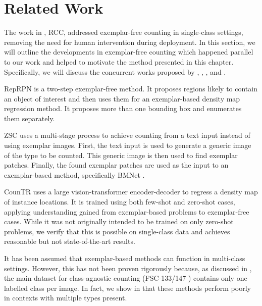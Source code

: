 \documentclass[../thesis.tex]{subfiles}
\begin{document}
\section{Related Work}
\label{relatedwork}
The work in , RCC, addressed exemplar-free counting in single-class settings, removing the need for human intervention during deployment.
In this section, we will outline the developments in exemplar-free counting which happened parallel to our work and helped to motivate the method presented in this chapter.
Specifically, we will discuss the concurrent works proposed by \citet{ranjan2022exemplar}, \citet{liu2022countr}, \citet{xu2023zsc}, and \citet{paiss2023countclip}. 

RepRPN \cite{ranjan2022exemplar} is a two-step exemplar-free method. It proposes regions likely to contain an object of interest and then uses them for an exemplar-based density map regression method. 
It proposes more than one bounding box and enumerates them separately.

ZSC \cite{liu2022countr} uses a multi-stage process to achieve counting from a text input instead of using exemplar images. First,  the text input is used to generate a generic image of the type to be counted. This generic image is then used to find exemplar patches. Finally, the found exemplar patches are used as the input to an exemplar-based method, specifically BMNet \cite{shi2022represent}.

CounTR \cite{xu2023zsc} uses a large vision-transformer encoder-decoder to regress a density map of instance locations. It is trained using both few-shot and zero-shot cases, applying understanding gained from exemplar-based problems to exemplar-free cases. While it was not originally intended to be trained on only zero-shot problems, we verify that this is possible on single-class data and achieves reasonable but not state-of-the-art results.

It has been assumed that exemplar-based methods can function in multi-class settings. However, this has not been proven rigorously because, as discussed in , the main dataset for class-agnostic counting (FSC-133/147 \cite{ranjan2021Famnet, ltcahobley}) contains only one labelled class per image. 
In fact, we show in  that these methods perform poorly in contexts with multiple types present.
\end{document}
